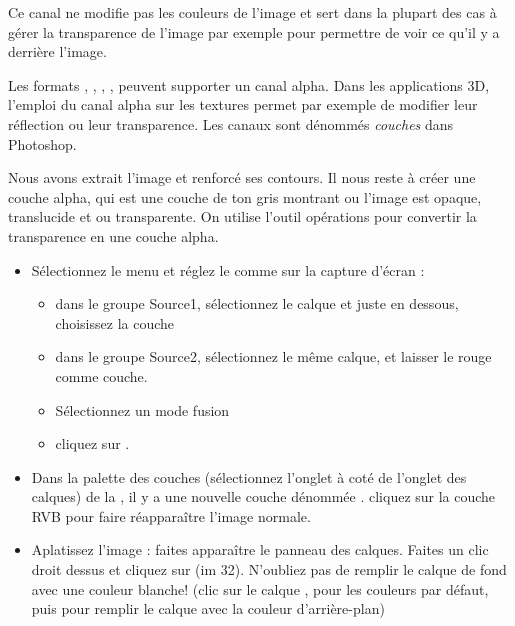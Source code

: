 \documentclass[a4paper,12pt,french]{sphinxmanual}
\begin{document}
Ce canal ne modifie pas les couleurs de l'image et sert dans la plupart des cas à gérer la transparence de l'image par exemple pour permettre de voir ce qu'il y a derrière l'image.

Les formats , , , , peuvent supporter un canal alpha. Dans les applications 3D, l'emploi du canal alpha sur les textures permet par exemple de modifier leur réflection ou leur transparence. Les canaux sont dénommés \emph{couches} dans Photoshop.

Nous avons extrait l'image et renforcé ses contours. Il nous reste à créer une couche alpha, qui est une couche de ton gris montrant ou l'image est opaque, translucide et ou transparente. On utilise l'outil opérations pour convertir la transparence en une couche alpha.
\begin{itemize}
\item {} 
Sélectionnez le menu  et réglez le comme sur la capture d'écran :
\begin{itemize}
\item {} 
dans le groupe Source1, sélectionnez le calque  et juste en dessous, choisissez la couche 

\item {} 
dans le groupe Source2, sélectionnez le même calque, et laisser le rouge comme couche.

\item {} 
Sélectionnez un mode fusion 

\item {} 
cliquez sur .

\end{itemize}

\item {} 
Dans la palette des couches (sélectionnez l'onglet à coté de l'onglet des calques) de la , il y a une nouvelle couche dénommée . cliquez sur la couche RVB pour faire réapparaître l'image normale.

\item {} 
Aplatissez l'image : faites apparaître le panneau des calques. Faites un clic droit dessus et cliquez sur  (im 32). N'oubliez pas de remplir le calque de fond avec une couleur blanche! (clic sur le calque ,  pour les couleurs par défaut, puis  pour remplir le calque avec la couleur d'arrière-plan)

\end{itemize}
\end{document}
